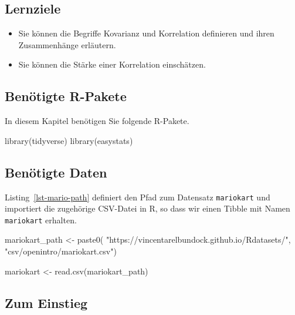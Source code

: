\documentclass[
  a4paper,
]{scrbook}
\newenvironment{Shaded}{\begin{snugshade}}{\end{snugshade}}
\newcommand{\FunctionTok}[1]{\textcolor[rgb]{0.28,0.35,0.67}{#1}}
\newcommand{\NormalTok}[1]{\textcolor[rgb]{0.00,0.23,0.31}{#1}}
\newcommand{\OtherTok}[1]{\textcolor[rgb]{0.00,0.23,0.31}{#1}}
\newcommand{\StringTok}[1]{\textcolor[rgb]{0.13,0.47,0.30}{#1}}
\providecommand{\tightlist}{%
  \setlength{\itemsep}{0pt}\setlength{\parskip}{0pt}}\usepackage{longtable,booktabs,array}
\theoremstyle{definition}
\theoremstyle{definition}
\theoremstyle{definition}
\theoremstyle{remark}
\begin{document}
\subsection{Lernziele}\label{lernziele-7}

\begin{itemize}
\tightlist
\item
  Sie können die Begriffe Kovarianz und Korrelation definieren und ihren
  Zusammenhänge erläutern.
\item
  Sie können die Stärke einer Korrelation einschätzen.
\end{itemize}

\subsection{Benötigte R-Pakete}\label{benuxf6tigte-r-pakete-4}

In diesem Kapitel benötigen Sie folgende R-Pakete.

\begin{Shaded}
\begin{Highlighting}[]
\FunctionTok{library}\NormalTok{(tidyverse)}
\FunctionTok{library}\NormalTok{(easystats)}
\end{Highlighting}
\end{Shaded}

\subsection{Benötigte Daten}\label{benuxf6tigte-daten-5}

Listing~\ref{lst-mario-path} definiert den Pfad zum Datensatz
\texttt{mariokart} und importiert die zugehörige CSV-Datei in R, so dass
wir einen Tibble mit Namen \texttt{mariokart} erhalten.

\begin{Shaded}
\begin{Highlighting}[]
\NormalTok{mariokart\_path }\OtherTok{\textless{}{-}} \FunctionTok{paste0}\NormalTok{(}
  \StringTok{"https://vincentarelbundock.github.io/Rdatasets/"}\NormalTok{,}
  \StringTok{"csv/openintro/mariokart.csv"}\NormalTok{)}

\NormalTok{mariokart }\OtherTok{\textless{}{-}} \FunctionTok{read.csv}\NormalTok{(mariokart\_path)}
\end{Highlighting}
\end{Shaded}

\subsection{Zum Einstieg}\label{zum-einstieg-2}
\end{document}
